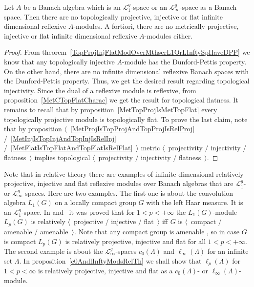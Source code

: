 \begin{corollary}\label{NoInfDimRefMetTopProjInjFlatModOverMthscrL1OrLInfty} Let
$A$ be a Banach algebra which is an $\mathscr{L}_1^g$-space or an 
$\mathscr{L}_\infty^g$-space as a Banach space. Then there are no topologically
projective, injective or flat infinite dimensional reflexive $A$-modules. A
fortiori, there are no metrically projective, injective or flat infinite
dimensional reflexive $A$-modules either.
\end{corollary}
\begin{proof} From theorem~\ref{TopProjInjFlatModOverMthscrL1OrLInftySpHaveDPP}
we know that any topologically injective $A$-module has the Dunford-Pettis
property. On the other hand, there are no infinite dimensional reflexive Banach
spaces with the Dunford-Pettis property. Thus, we get the desired result
regarding topological injectivity. Since the dual of a reflexive module is reflexive,
from proposition~\ref{MetCTopFlatCharac} we get the result for topological
flatness. It remains to recall that by proposition~\ref{MetTopProjIsMetTopFlat}
every topologically projective module is topologically flat. To prove the last
claim, note that by proposition $\langle$~\ref{MetProjIsTopProjAndTopProjIsRelProj}
/~\ref{MetInjIsTopInjAndTopInjIsRelInj}
/~\ref{MetFlatIsTopFlatAndTopFlatIsRelFlat}~$\rangle$ metric 
$\langle$~projectivity / injectivity / flatness~$\rangle$
implies topological $\langle$~projectivity / injectivity / flatness~$\rangle$.
\end{proof}

Note that in relative theory there are examples of infinite dimensional
relatively projective, injective and flat reflexive modules over Banach algebras
that are $\mathscr{L}_1^g$- or $\mathscr{L}_\infty^g$-spaces. Here are two
examples. The first one is about the convolution algebra $L_1(G)$ on a locally
compact group $G$ with the left Haar measure. It is an $\mathscr{L}_1^g$-space. In
\cite[\S6]{DalPolHomolPropGrAlg} and~\cite{RachInjModAndAmenGr} it was proved
that for $1<p<+\infty$ the $L_1(G)$-module $L_p(G)$ is relatively
$\langle$~projective / injective / flat~$\rangle$ iff $G$ is $\langle$~compact /
amenable / amenable~$\rangle$. Note that any compact group is amenable
\cite[proposition 3.12.1]{PierAmenLCA}, so in case $G$ is compact $L_p(G)$ is
relatively projective, injective and flat for all $1<p<+\infty$.  The second
example is about the $\mathscr{L}_\infty^g$-spaces $c_0(\Lambda)$ and
$\ell_\infty(\Lambda)$ for an infinite set $\Lambda$. In
proposition~\ref{c0AndlInftyModsRelTh} we shall show that $\ell_p(\Lambda)$ for
$1<p<\infty$ is relatively projective, injective and flat as a $c_0(\Lambda)$- or
$\ell_\infty(\Lambda)$-module. 

